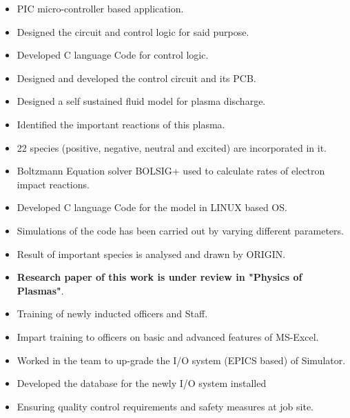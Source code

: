 \documentclass[10pt,a4paper]{altacv}
\begin{document}
{
\begin{itemize}
\item PIC micro-controller based application.
\item Designed the circuit and control logic for said purpose.
\item Developed C language Code for control logic.
\item Designed and developed the control circuit and its PCB. 
\end{itemize}

\begin{itemize}
\item Designed a self sustained fluid model for plasma discharge.
\item Identified the important reactions of this plasma.
\item 22 species (positive, negative, neutral and excited) are incorporated in it.
\item Boltzmann Equation solver BOLSIG+ used to calculate rates of electron impact reactions.
\item Developed C language Code for the model in LINUX based OS.
\item Simulations of the code has been carried out by varying different parameters.
\item Result of important species is analysed and drawn by ORIGIN.
\item \textbf{Research paper of this work is under review in "Physics of Plasmas"}.
\end{itemize}


\begin{itemize}
\item Training of newly inducted officers and Staff.
\item Impart training to officers on basic and advanced features of MS-Excel.
\item Worked in the team to up-grade the I/O system (EPICS based) of Simulator.
\item Developed the database for the newly I/O system installed
\item Ensuring quality control requirements and safety measures at job site.
\end{itemize}



}
\end{document}
